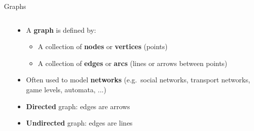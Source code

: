 \begin{frame}{Graphs}
\begin{columns}
\begin{column}{0.3\textwidth}
		\end{column}
		\begin{column}{0.68\textwidth}
			\begin{itemize}
				\pause\item A \textbf{graph} is defined by:
					\begin{itemize}
						\pause\item A collection of \textbf{nodes} or \textbf{vertices} (points)
						\pause\item A collection of \textbf{edges} or \textbf{arcs} (lines or arrows between points)
					\end{itemize}
				\pause\item Often used to model \textbf{networks} (e.g.\ social networks, transport networks, game levels, automata, ...)
				\pause\item \textbf{Directed} graph: edges are arrows
				\pause\item \textbf{Undirected} graph: edges are lines
			\end{itemize}
		\end{column}
	\end{columns}
\end{frame}

